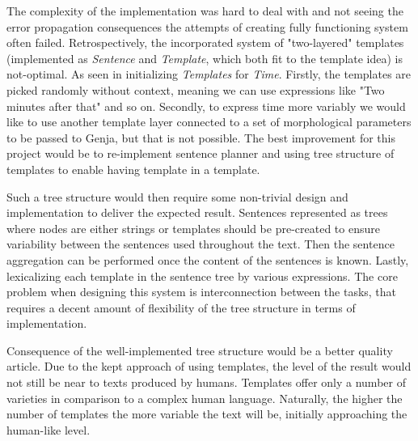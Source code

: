 The complexity of the implementation was hard to deal with and not seeing the error propagation consequences the attempts of creating fully functioning system often failed. Retrospectively, the incorporated system of "two-layered" templates (implemented as \textit{Sentence} and \textit{Template}, which both fit to the template idea) is not-optimal. As seen in initializing \textit{Templates} for \textit{Time}. Firstly, the templates are picked randomly without context, meaning we can use expressions like "Two minutes after that" and so on. Secondly, to express time more variably we would like to use another template layer connected to a set of morphological parameters to be passed to Genja, but that is not possible. The best improvement for this project would be to re-implement sentence planner and using tree structure of templates to enable having template in a template. 

Such a tree structure would then require some non-trivial design and implementation to deliver the expected result. Sentences represented as trees where nodes are either strings or templates should be pre-created  to ensure variability between the sentences used throughout the text. Then the sentence aggregation can be performed once the content of the sentences is known. Lastly, lexicalizing each template in the sentence tree by various expressions. The core problem when designing this system is interconnection between the tasks, that requires a decent amount of flexibility of the tree structure in terms of implementation.  

Consequence of the well-implemented tree structure would be a better quality article. Due to the kept approach of using templates, the level of the result would not still be near to texts produced by humans. Templates offer only a number of varieties in comparison to a complex human language. Naturally, the higher the number of templates the more variable the text will be, initially approaching the human-like level. 

